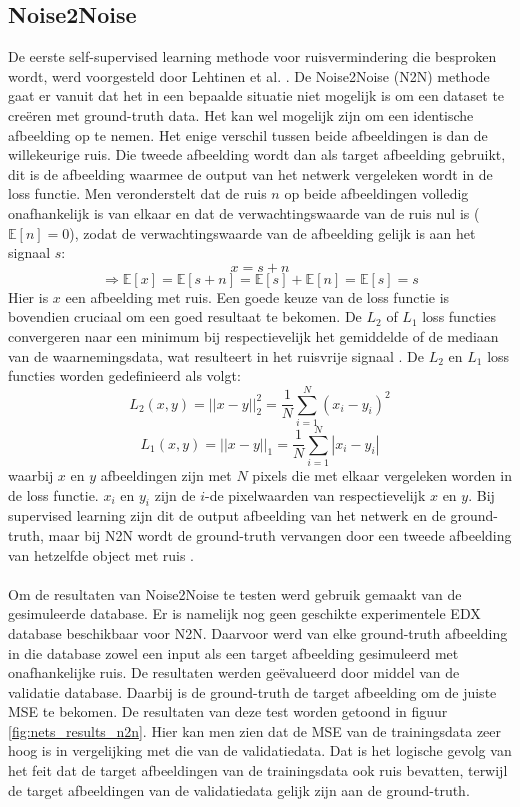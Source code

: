 \documentclass{report}
\begin{document}
\subsection{Noise2Noise} \label{ch:n2n}
De eerste self-supervised learning methode voor ruisvermindering die besproken wordt, werd voorgesteld door Lehtinen et al. \cite{paper:n2n}. De Noise2Noise (N2N) methode gaat er vanuit dat het in een bepaalde situatie niet mogelijk is om een dataset te creëren met ground-truth data. Het kan wel mogelijk zijn om een identische afbeelding op te nemen. Het enige verschil tussen beide afbeeldingen is dan de willekeurige ruis. Die tweede afbeelding wordt dan als target afbeelding gebruikt, dit is de afbeelding waarmee de output van het netwerk vergeleken wordt in de loss functie. Men veronderstelt dat de ruis $n$ op beide afbeeldingen volledig onafhankelijk is van elkaar en dat de verwachtingswaarde van de ruis nul is ($\mathbb{E}[n] = 0$), zodat de verwachtingswaarde van de afbeelding gelijk is aan het signaal $s$:
\[ x = s + n \]
\[ \Rightarrow \mathbb{E}[x] = \mathbb{E}[s + n] = \mathbb{E}[s] + \mathbb{E}[n] = \mathbb{E}[s] = s \]
Hier is $x$ een afbeelding met ruis. Een goede keuze van de loss functie is bovendien cruciaal om een goed resultaat te bekomen. De $L_2$ of $L_1$ loss functies convergeren naar een minimum bij respectievelijk het gemiddelde of de mediaan van de waarnemingsdata, wat resulteert in het ruisvrije signaal \cite{paper:n2n}. De $L_2$ en $L_1$ loss functies worden gedefinieerd als volgt:
\[ L_2(x, y) = ||x-y||_2^2 = \frac{1}{N} \sum_{i=1}^N (x_i-y_i)^2 \]
\[ L_1(x, y) = ||x-y||_1 = \frac{1}{N} \sum_{i=1}^N |x_i-y_i| \]
waarbij $x$ en $y$ afbeeldingen zijn met $N$ pixels die met elkaar vergeleken worden in de loss functie. $x_i$ en $y_i$ zijn de $i$-de pixelwaarden van respectievelijk $x$ en $y$. Bij supervised learning zijn dit de output afbeelding van het netwerk en de ground-truth, maar bij N2N wordt de ground-truth vervangen door een tweede afbeelding van hetzelfde object met ruis \cite{paper:n2n}.
\\ \\
Om de resultaten van Noise2Noise te testen werd gebruik gemaakt van de gesimuleerde database. Er is namelijk nog geen geschikte experimentele EDX database beschikbaar voor N2N. Daarvoor werd van elke ground-truth afbeelding in die database zowel een input als een target afbeelding gesimuleerd met onafhankelijke ruis. De resultaten werden geëvalueerd door middel van de validatie database. Daarbij is de ground-truth de target afbeelding om de juiste MSE te bekomen. De resultaten van deze test worden getoond in figuur \ref{fig:nets_results_n2n}. Hier kan men zien dat de MSE van de trainingsdata zeer hoog is in vergelijking met die van de validatiedata. Dat is het logische gevolg van het feit dat de target afbeeldingen van de trainingsdata ook ruis bevatten, terwijl de target afbeeldingen van de validatiedata gelijk zijn aan de ground-truth.
\end{document}
